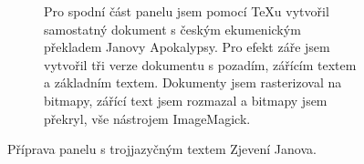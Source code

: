 \begin{figure}[p]
\begin{subfigure}{\linewidth}
\centering
{}
\par\vspace{-1.5pt}
\caption{Pro spodní část panelu jsem pomocí \TeX u vytvořil samostatný dokument s českým ekumenickým překladem Janovy Apokalypsy. Pro efekt záře jsem vytvořil tři verze dokumentu s pozadím, zářícím textem a základním textem. Dokumenty jsem rasterizoval na bitmapy, zářící text jsem rozmazal a bitmapy jsem překryl, vše nástrojem ImageMagick.}
\label{fig:screen2-texts-czech}
\end{subfigure}
\caption{Příprava panelu s trojjazyčným textem Zjevení Janova.}
\label{fig:screen2-texts}
\end{figure}